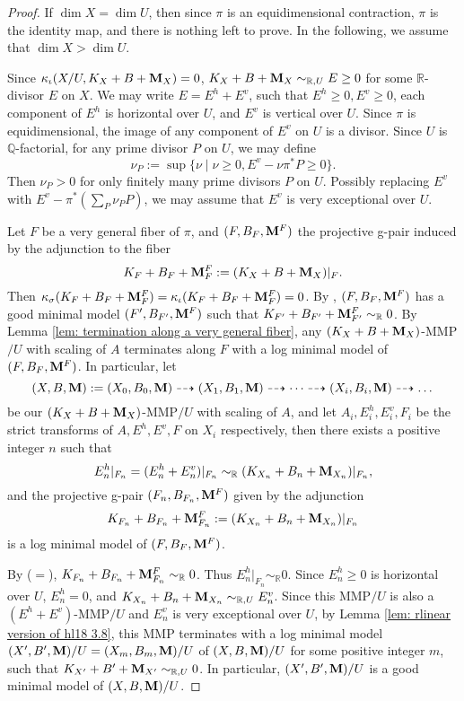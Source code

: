 \documentclass[11pt]{amsart}
\numberwithin{equation}{section}
\newcommand{\Mm}{{\bf{M}}}
\newcommand{\Qq}{\mathbb{Q}}
\newcommand{\Rr}{\mathbb{R}}
\theoremstyle{definition}
\theoremstyle{definition}
\theoremstyle{definition}
\begin{document}
\begin{proof}
If $\dim X=\dim U$, then since $\pi$ is an equidimensional contraction, $\pi$ is the identity map, and there is nothing left to prove. In the following, we assume that $\dim X>\dim U$.

Since $\kappa_{\iota}(X/U,K_X+B+\Mm_X)=0$, $K_X+B+\Mm_X\sim_{\Rr,U}E\geq 0$ for some $\Rr$-divisor $E$ on $X$. We may write $E=E^{h}+E^{v}$, such that $E^h\geq 0,E^v\geq 0$, each component of $E^h$ is horizontal over $U$, and $E^v$ is vertical over $U$. Since $\pi$ is equidimensional, the image of any component of $E^v$ on $U$ is a divisor. Since $U$ is $\Qq$-factorial, for any prime divisor $P$ on $U$, we may define
$$\nu_P:=\sup\{\nu\mid \nu\geq 0, E^v-\nu\pi^*P\geq 0\}.$$
Then $\nu_P>0$  for only finitely many prime divisors $P$ on $U$. Possibly replacing $E^v$ with $E^v-\pi^*(\sum_P\nu_PP)$, we may assume that $E^v$ is very exceptional over $U$. 

Let $F$ be a very general fiber of $\pi$, and $(F,B_F,\Mm^F)$ the projective g-pair induced by the adjunction to the fiber
$$K_F+B_F+\Mm^F_F:=(K_X+B+\Mm_X)|_F.$$
Then $\kappa_{\sigma}(K_F+B_F+\Mm^F_F)=\kappa_{\iota}(K_F+B_F+\Mm^F_F)=0$. By \cite[Lemma 3.10]{Has22}, $(F,B_F,\Mm^F)$ has a good minimal model $(F',B_{F'},\Mm^F)$ such that $K_{F'}+B_{F'}+\Mm^F_{F'}\sim_{\Rr}0$. By Lemma \ref{lem: termination along a very general fiber}, any $(K_X+B+\Mm_X)$-MMP$/U$ with scaling of $A$ terminates along $F$ with a log minimal model of $(F,B_F,\Mm^F)$. In particular, let 
$$(X,B,\Mm):=(X_0,B_0,\Mm)\dashrightarrow (X_1,B_1,\Mm)\dashrightarrow\dots\dashrightarrow (X_i,B_i,\Mm)\dashrightarrow\dots$$
be our $(K_X+B+\Mm_X)$-MMP$/U$ with scaling of $A$, and let $A_i,E^h_i,E^v_i,F_i$ be the strict transforms of $A,E^h,E^v,F$ on $X_i$ respectively, then there exists a positive integer $n$ such that 
$$E_n^h|_{F_n}=(E_n^h+E_n^v)|_{F_n}\sim_{\Rr} (K_{X_n}+B_n+\Mm_{X_n})|_{F_n},$$
and the projective g-pair $(F_n,B_{F_n},\Mm^F)$ given by the adjunction
$$K_{F_n}+B_{F_n}+\Mm^F_{F_n}:=(K_{X_n}+B_n+\Mm_{X_n})|_{F_n}$$
is a log minimal model of $(F,B_F,\Mm^F)$.

By \cite[Lemma 3.5(1)]{HL21} ($=$\cite[Version 3, Lemma 3.9(1)]{HL21}), $K_{F_n}+B_{F_n}+\Mm^F_{F_n}\sim_{\Rr}0$. Thus $E^h_n|_{F_n}\sim_{\Rr}0$. Since $E^h_n\geq 0$ is horizontal over $U$, $E^h_n=0$, and $K_{X_n}+B_n+\Mm_{X_n}\sim_{\Rr,U}E^v_n$.
Since this MMP$/U$ is also a $(E^h+E^v)$-MMP$/U$ and $E^v_n$ is very exceptional over $U$, by Lemma \ref{lem: rlinear version of hl18 3.8}, this MMP terminates with a log minimal model $(X',B',\Mm)/U=(X_m,B_m,\Mm)/U$ of $(X,B,\Mm)/U$ for some positive integer $m$, such that $K_{X'}+B'+\Mm_{X'}\sim_{\Rr,U}0$. In particular, $(X',B',\Mm)/U$ is a good minimal model of $(X,B,\Mm)/U$.
\end{proof}
\end{document}
